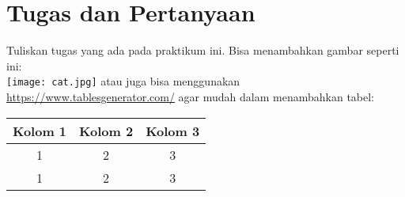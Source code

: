 \chapter{Tugas dan Pertanyaan}

Tuliskan tugas yang ada pada praktikum ini. Bisa menambahkan gambar seperti ini:\\
\texttt{[image: cat.jpg]}
atau juga bisa menggunakan \url{https://www.tablesgenerator.com/} agar mudah dalam 
menambahkan tabel:
\begin{table}[h!]
\begin{tabular}{|c|c|c|}
\hline
\textbf{Kolom 1} & \textbf{Kolom 2} & \textbf{Kolom 3} \\ \hline
1                & 2                & 3                \\ \hline
1                & 2                & 3                \\ \hline
\end{tabular}
\end{table}